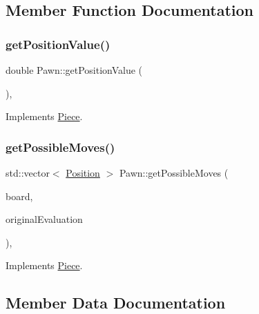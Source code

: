\subsection{Member Function Documentation}
\mbox{\label{class_pawn_a332e70ab65f480521428aa87c7cd2ef9}} 
\subsubsection{\texorpdfstring{get\+Position\+Value()}{getPositionValue()}}
{\footnotesize\ttfamily double Pawn\+::get\+Position\+Value (\begin{DoxyParamCaption}{ }\end{DoxyParamCaption})\hspace{0.3cm}{\ttfamily [override]}, {\ttfamily [virtual]}}



Implements \hyperlink{class_piece_a4adfa58b4f0368c9a5859afcf294e0a4}{Piece}.

\mbox{\label{class_pawn_af83688d6061d4dc14274af99bcbd2614}} 
\subsubsection{\texorpdfstring{get\+Possible\+Moves()}{getPossibleMoves()}}
{\footnotesize\ttfamily std\+::vector$<$ \hyperlink{struct_position}{Position} $>$ Pawn\+::get\+Possible\+Moves (\begin{DoxyParamCaption}\item[{std\+::shared\+\_\+ptr$<$ \hyperlink{class_base_board}{Base\+Board} $>$}]{board,  }\item[{bool}]{original\+Evaluation }\end{DoxyParamCaption})\hspace{0.3cm}{\ttfamily [override]}, {\ttfamily [virtual]}}



Implements \hyperlink{class_piece_a8891924c280568529878549f59541925}{Piece}.



\subsection{Member Data Documentation}
\mbox{\label{class_pawn_aac8df37fd58c41fe91460325e5447464}} 
